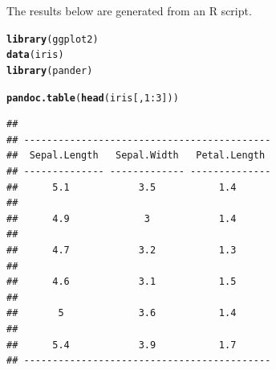 \documentclass{article}\usepackage[]{graphicx}\usepackage[]{color}
\makeatletter
\newcommand{\hlnum}[1]{\textcolor[rgb]{0.686,0.059,0.569}{#1}}%
\newcommand{\hlopt}[1]{\textcolor[rgb]{0,0,0}{#1}}%
\newcommand{\hlstd}[1]{\textcolor[rgb]{0.345,0.345,0.345}{#1}}%
\newcommand{\hlkwd}[1]{\textcolor[rgb]{0.737,0.353,0.396}{\textbf{#1}}}%
\newenvironment{kframe}{%
 \def\at@end@of@kframe{}%
 \ifinner\ifhmode%
  \def\at@end@of@kframe{\end{minipage}}%
  \begin{minipage}{\columnwidth}%
 \fi\fi%
 \def\FrameCommand##1{\hskip\@totalleftmargin \hskip-\fboxsep
 \colorbox{shadecolor}{##1}\hskip-\fboxsep
     \hskip-\linewidth \hskip-\@totalleftmargin \hskip\columnwidth}%
 \MakeFramed {\advance\hsize-\width
   \@totalleftmargin\z@ \linewidth\hsize
   \@setminipage}}%
 {\par\unskip\endMakeFramed%
 \at@end@of@kframe}
\newenvironment{knitrout}{}{} %
\makeatother
\begin{document}
The results below are generated from an R script.

\begin{knitrout}
\color{fgcolor}\begin{kframe}
\begin{alltt}
\hlkwd{library}\hlstd{(ggplot2)}
\hlkwd{data}\hlstd{(iris)}
\hlkwd{library}\hlstd{(pander)}
\end{alltt}


{\ttfamily\noindent\itshape\color{messagecolor}{\#\# \\\#\# Attaching package: 'pander'\\\#\# \\\#\# The following object is masked from 'package:knitr':\\\#\# \\\#\#\ \ \ \  pandoc}}\end{kframe}
\end{knitrout}
\begin{knitrout}
\color{fgcolor}\begin{kframe}
\begin{alltt}
\hlkwd{pandoc.table}\hlstd{(}\hlkwd{head}\hlstd{(iris[,} \hlnum{1}\hlopt{:}\hlnum{3}\hlstd{]))}
\end{alltt}
\begin{verbatim}
## 
## -------------------------------------------
##  Sepal.Length   Sepal.Width   Petal.Length 
## -------------- ------------- --------------
##      5.1            3.5           1.4      
## 
##      4.9             3            1.4      
## 
##      4.7            3.2           1.3      
## 
##      4.6            3.1           1.5      
## 
##       5             3.6           1.4      
## 
##      5.4            3.9           1.7      
## -------------------------------------------
\end{verbatim}
\end{kframe}
\end{knitrout}
\end{document}
